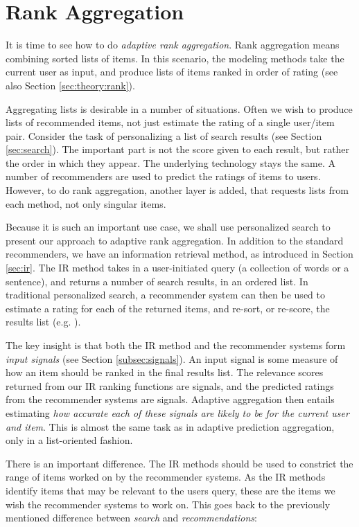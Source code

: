 \section{Rank Aggregation}
\label{sec:methods:rank}

It is time to see how to do \emph{adaptive rank aggregation}. 
Rank aggregation means combining sorted lists of items.
In this scenario, the modeling methods take the current user as input, and produce 
lists of items ranked in order of rating (see also Section \ref{sec:theory:rank}).

Aggregating lists is desirable in a number of situations.
Often we wish to produce lists of recommended items, not just estimate the rating of a single user/item pair.
Consider the task of personalizing a list of search results
(see Section \ref{sec:search}). The important part is not the score
given to each result, but rather the order in which they appear.
The underlying technology stays the same. A number of recommenders are used to predict the ratings
of items to users. However, to do rank aggregation, another layer is added, that requests lists from each method,
not only singular items.

Because it is such an important use case, we shall use personalized search to present our approach to adaptive rank aggregation.
In addition to the standard recommenders, we have an information retrieval method,
as introduced in Section \ref{sec:ir}.
The IR method takes in a user-initiated query (a collection of words or a sentence), and returns a number of 
search results, in an ordered list.
In traditional personalized search, a recommender system can then be used to estimate a rating for each of the returned items,
and re-sort, or re-score, the results list (e.g. \citet[p.3]{Xu2008}).

The key insight is that both the IR method and the recommender systems form \emph{input signals}
(see Section \ref{subsec:signals}).
An input signal is some measure of how an item should be ranked in the final results list.
The relevance scores returned from our IR ranking functions are signals,
and the predicted ratings from the recommender systems are signals.
Adaptive aggregation then entails estimating \emph{how accurate each of these signals are likely to be for the current user and item}.
This is almost the same task as in adaptive prediction aggregation, only in a list-oriented fashion.

There is an important difference. 
The IR methods should be used to constrict the range of items worked on by the recommender systems.
As the IR methods identify items that may be relevant to the users query, these are the items we wish the recommender systems to work on.
This goes back to the previously mentioned difference between \emph{search} and \emph{recommendations}:

